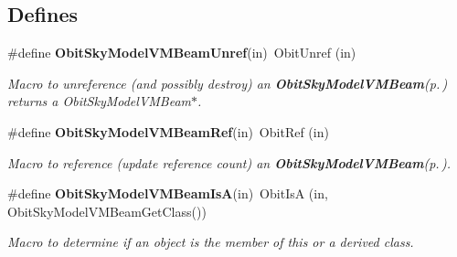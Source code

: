\subsection*{Defines}
\begin{CompactItemize}
\item 
\#define {\bf Obit\-Sky\-Model\-VMBeam\-Unref}(in)\ Obit\-Unref (in)
\begin{CompactList}\small\item\em Macro to unreference (and possibly destroy) an {\bf Obit\-Sky\-Model\-VMBeam}{\rm (p.\,\pageref{structObitSkyModelVMBeam})} returns a Obit\-Sky\-Model\-VMBeam$\ast$. \item\end{CompactList}\item 
\#define {\bf Obit\-Sky\-Model\-VMBeam\-Ref}(in)\ Obit\-Ref (in)
\begin{CompactList}\small\item\em Macro to reference (update reference count) an {\bf Obit\-Sky\-Model\-VMBeam}{\rm (p.\,\pageref{structObitSkyModelVMBeam})}. \item\end{CompactList}\item 
\#define {\bf Obit\-Sky\-Model\-VMBeam\-Is\-A}(in)\ Obit\-Is\-A (in, Obit\-Sky\-Model\-VMBeam\-Get\-Class())
\begin{CompactList}\small\item\em Macro to determine if an object is the member of this or a derived class. \item\end{CompactList}\end{CompactItemize}
